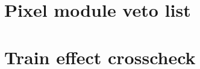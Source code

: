 

\clearpage
\appendix
\section{Pixel module veto list}
\label{sec:appendix1}

\section{Train effect crosscheck}
\label{sec:appendix2}



